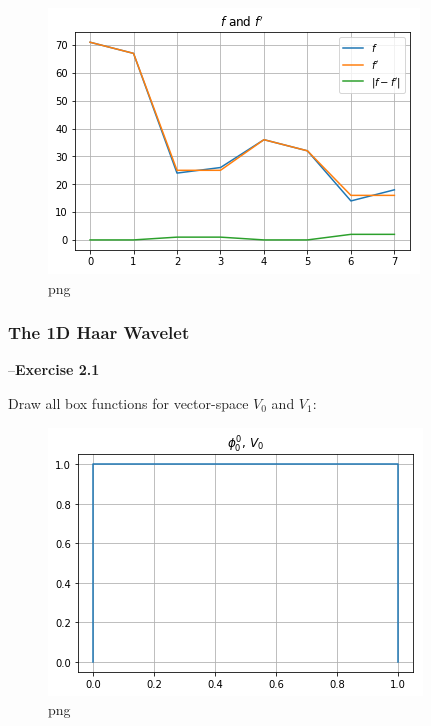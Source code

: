 \documentclass{letter}
\newcommand{\paragraph}[1]{\smallskip--\noindent\textbf{#1}}
\begin{document}
\begin{figure}[h]
  \begin{center}
    \includegraphics{output_5_0.png} 
  \end{center}
  \caption{png}
\end{figure}

\subsubsection{The 1D Haar Wavelet}\label{the-1d-haar-wavelet}

\paragraph{Exercise 2.1}\label{exercise-2.1}

Draw all box functions for vector-space $V_0$ and $V_1$:

\begin{figure}[h]
  \begin{center}
    \includegraphics{output_7_0.png} 
  \end{center}
  \caption{png}
\end{figure}
\end{document}
